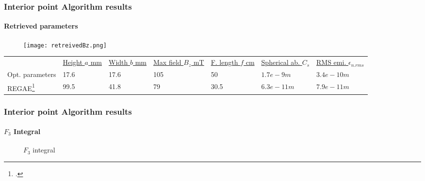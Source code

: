 \begin{frame}
  \frametitle{Interior point Algorithm results}
  \rfn
  \framesubtitle{Retrieved parameters}
    \begin{figure}
    \texttt{[image: retreivedBz.png]}
  \end{figure}
    \begin{tiny}
    \begin{table}[t]
    \centering
    \begin{tabular}{    m{1.4cm}|| m{0.9cm}| m{0.9cm} | m{1.2cm}| m{1.1cm}| m{1.5cm}| m{1.5cm}}
    & \underline{Height $a$ mm} & \underline{Width $b$ mm}& \underline{Max field $ B_z$ mT}& \underline{F. length $f$ cm}& \underline{Spherical ab. $C_s$ }& \underline{RMS emi. $\epsilon_{n.rms}$ } \\
    Opt. parameters    &17.6 & 17.6 &105& 50   &$1.7e-9 m$   &$3.4e-10 m$\\
    REGAE\footcite{Disser} & 99.5 & 41.8&79  & 30.5&$6.3e-11 m$ &$7.9e-11 m$\\
  \end{tabular}
  \end{table}
    \end{tiny}
\end{frame}

\begin{frame}
  \frametitle{Interior point Algorithm results}
  \rfn
  \framesubtitle{$F_3$ Integral}
  \begin{figure}
    \centering
    \label{some example}
    \caption{$F_3$ integral}
  \end{figure}
\end{frame}
